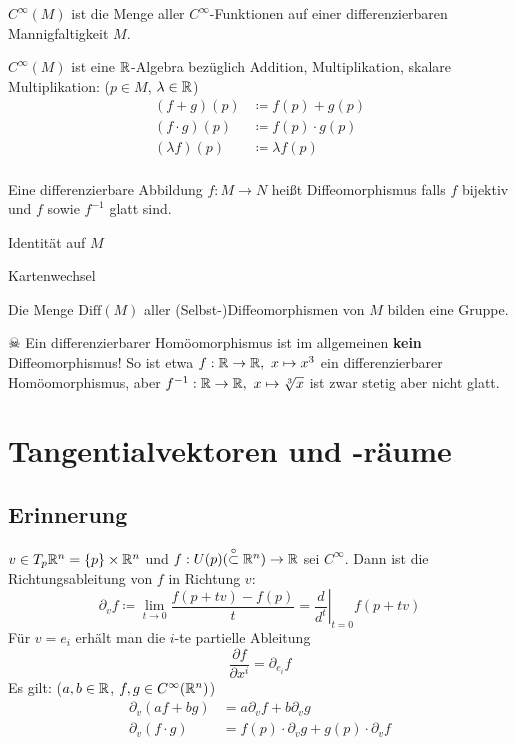 \documentclass[a4paper,twoside,DIV15,BCOR12mm]{scrbook}
\newcommand{\otm}{\stackrel{\circ}{\subset}} %
\renewcommand{\da}{\coloneqq}
\begin{document}
\begin{definition}
$C^\infty(M)$ ist die Menge aller $C^\infty$-Funktionen auf einer differenzierbaren Mannigfaltigkeit $M$.
\end{definition}

\begin{bemerkung}
$C^{\infty}(M)$ ist eine $\mathbb{R}$-Algebra bezüglich Addition, Multiplikation, skalare Multiplikation: ($p\in M$, $\lambda \in \mathbb{R}$)
\begin{align*}
(f+g)(p) &\da f(p) + g(p)   \\
(f\cdot g)(p) &\da f(p) \cdot g(p)  \\
(\lambda f)(p) &\da \lambda f(p) \\
\end{align*}
\end{bemerkung}

\begin{definition}[Diffeomorphismus]
Eine differenzierbare Abbildung $f:M\to N$ heißt Diffeomorphismus falls $f$ bijektiv und $f$ sowie $f^{-1}$ glatt sind.
\end{definition}

\begin{beispiele}
\item Identität auf $M$
\item Kartenwechsel
\end{beispiele}

Die Menge $\text{Diff}(M)$ aller (Selbst-)Diffeomorphismen von $M$ bilden eine Gruppe.


$\skull$
Ein differenzierbarer Homöomorphismus ist im allgemeinen \textbf{kein} Diffeomorphismus! So ist etwa $f:\mathbb{R}\to\mathbb{R},\ x\mapsto x^3$ ein differenzierbarer Homöomorphismus, aber $f^{-1} :\MdR \to \MdR, \ x\mapsto\sqrt[3]{x}$ ist zwar stetig aber nicht glatt.

\section{Tangentialvektoren und -räume}

\subsection*{Erinnerung}
$v \in T_p\mathbb{R}^n = \{p\} \times \mathbb{R}^n$ und $f:U(p) (\otm \MdR^n) \to \MdR$ sei $C^\infty$. Dann ist die Richtungsableitung von $f$ in Richtung $v$:
\[
\partial_vf \da  \lim_{t\to0} \frac{f(p+tv) - f(p)}{t} = \left.\frac{d}{d^t}\right|_{t=0} f(p+tv)
\]
Für $v=e_i$ erhält man die $i$-te partielle Ableitung
\[ \frac{\partial f}{\partial x^i} = \partial_{e_i} f \]
Es gilt: ($a,b\in\mathbb{R}$, $f,g\in C^\infty(\mathbb{R}^n)$)
\begin{align*}
\partial_v(af + bg) &= a\partial_v f+ b\partial_v g \\
\partial_v(f \cdot g) &= f(p)\cdot\partial_v g+ g(p)\cdot\partial_v f
\end{align*}
\end{document}
